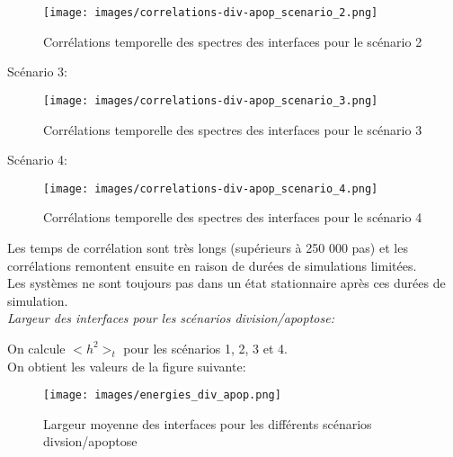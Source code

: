 \documentclass[11pt,a4paper]{article}
\begin{document}
\begin{figure}[H]
\begin{center}
\texttt{[image: images/correlations-div-apop\_scenario\_2.png]}
\caption{Corrélations temporelle des spectres des interfaces pour le scénario 2}
\label{mafigure}
\end{center}
\end{figure}

Scénario 3:\\

\begin{figure}[H]
\begin{center}
\texttt{[image: images/correlations-div-apop\_scenario\_3.png]}
\caption{Corrélations temporelle des spectres des interfaces pour le scénario 3}
\label{mafigure}
\end{center}
\end{figure}


Scénario 4:\\

\begin{figure}[H]
\begin{center}
\texttt{[image: images/correlations-div-apop\_scenario\_4.png]}
\caption{Corrélations temporelle des spectres des interfaces pour le scénario 4}
\label{mafigure}
\end{center}
\end{figure}

Les temps de corrélation sont très longs (supérieurs à 250 000 pas) et les corrélations remontent ensuite en raison de durées de simulations limitées.\\

Les systèmes ne sont toujours pas dans un état stationnaire après ces durées de simulation.\\


\textit{Largeur des interfaces pour les scénarios division/apoptose:}

On calcule $<h^2>_t$ pour les scénarios 1, 2, 3 et 4.\\

On obtient les valeurs de la figure suivante:

\begin{figure}[H]
\begin{center}
\texttt{[image: images/energies\_div\_apop.png]}
\caption{Largeur moyenne des interfaces pour les différents scénarios divsion/apoptose}
\label{mafigure}
\end{center}
\end{figure}
\end{document}
